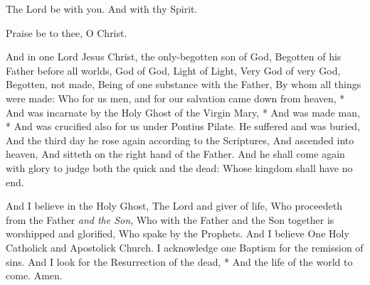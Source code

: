 \V The Lord be with you. \R And with thy Spirit. 


\centerline{}
\centerline{Praise be to thee, O Christ.}

\bigskip



And in one Lord Jesus Christ, the only-begotten son of God, Begotten of his Father before all worlds, God of God, Light of Light, Very God of very God, Begotten, not made, Being of one substance with the Father, By whom all things were made: Who for us men, and for our salvation came down from heaven, * And was incarnate by the Holy Ghost of the Virgin Mary, * And was made man, * And was crucified also for us under Pontius Pilate. He suffered and was buried, And the third day he rose again according to the Scriptures, And ascended into heaven, And sitteth on the right hand of the Father. And he shall come again with glory to judge both the quick and the dead: Whose kingdom shall have no end.

And I believe in the Holy Ghost, The Lord and giver of life, Who proceedeth from the Father \emph{and the Son}, Who with the Father and the Son together is worshipped and glorified, Who spake by the Prophets. And I believe One {Holy} Catholick and Apostolick Church. I acknowledge one Baptism for the remission of sins. And I look for the Resurrection of the dead, * And the life of the world to come. Amen.

\bigskip
{}%



